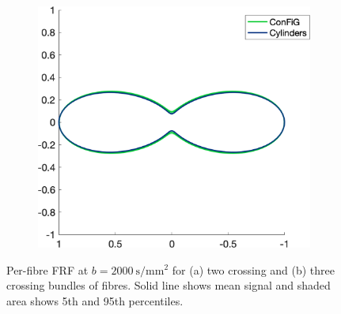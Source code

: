 \begin{figure}
\begin{subfigure}[]{0.32\textwidth}
    \caption{}
  \end{subfigure}
  ~
  \begin{subfigure}[]{0.32\textwidth}
    \includegraphics[width=\textwidth]{figures/frf_experiment/fibres_prctiles_kappa_100_b_2000.png}
    \caption{}
  \end{subfigure}

  \caption{Per-fibre FRF at $b = \SI{2000}{\second\per\milli\metre\squared}$ for (a) two crossing and (b) three crossing bundles of fibres. Solid line shows mean signal and shaded area shows 5th and 95th percentiles. }
  \label{fig:frf_prctiles_kappa_b2000}
\end{figure}

